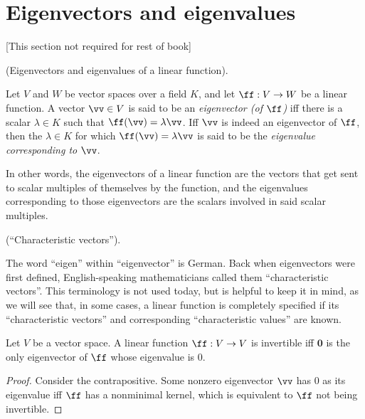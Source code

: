 \newpage

\section{Eigenvectors and eigenvalues}

[This section not required for rest of book]

\begin{defn}
    (Eigenvectors and eigenvalues of a linear function).
    
    Let $V$ and $W$ be vector spaces over a field $K$, and let $\ff:V \rightarrow W$ be a linear function. A vector $\vv \in V$ is said to be an \textit{eigenvector (of $\ff$)} iff there is a scalar $\lambda \in K$ such that $\ff(\vv) = \lambda \vv$. Iff $\vv$ is indeed an eigenvector of $\ff$, then the $\lambda \in K$ for which $\ff(\vv) = \lambda \vv$ is said to be the \textit{eigenvalue corresponding to $\vv$}.
    
    In other words, the eigenvectors of a linear function are the vectors that get sent to scalar multiples of themselves by the function, and the eigenvalues corresponding to those eigenvectors are the scalars involved in said scalar multiples.
\end{defn}

\begin{remark}
    (``Characteristic vectors'').
    
    The word ``eigen'' within ``eigenvector'' is German. Back when eigenvectors were first defined, English-speaking mathematicians called them ``characteristic vectors''. This terminology is not used today, but is helpful to keep it in mind, as we will see that, in some cases, a linear function is completely specified if its ``characteristic vectors'' and corresponding ``characteristic values'' are known.
\end{remark}

\begin{theorem}
    Let $V$ be a vector space. A linear function $\ff:V \rightarrow V$ is invertible iff $\mathbf{0}$ is the only eigenvector of $\ff$ whose eigenvalue is $0$.
\end{theorem}

\begin{proof}
   Consider the contrapositive. Some nonzero eigenvector $\vv$ has $0$ as its eigenvalue iff $\ff$ has a nonminimal kernel, which is equivalent to $\ff$ not being invertible.
\end{proof}

